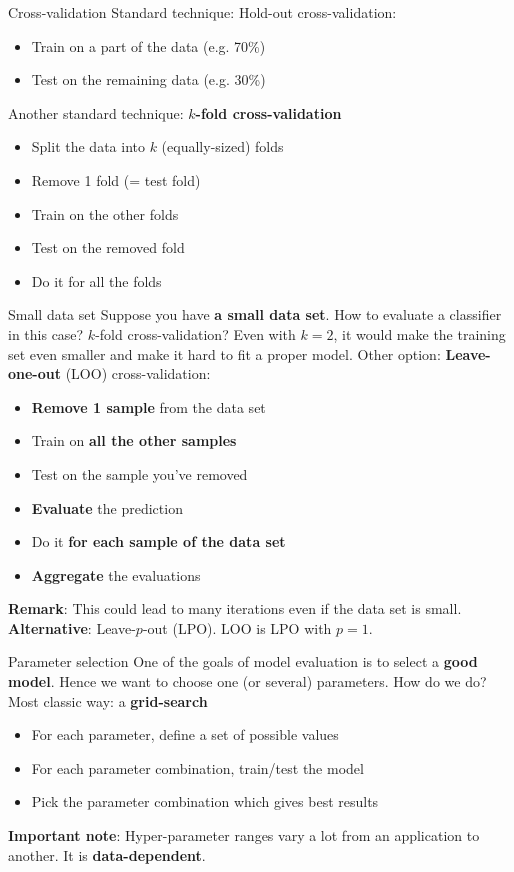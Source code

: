 \documentclass{beamer}
\newcommand{\1}[1]{\mathbbm{1}\left[#1\right]}
\begin{document}
\begin{frame}{Cross-validation}
Standard technique: Hold-out cross-validation:
\begin{itemize}
	\item Train on a part of the data (e.g. 70\%)
	\item Test on the remaining data (e.g. 30\%)
\end{itemize}
\pause
\vfill
Another standard technique: \textbf{$k$-fold cross-validation}
\begin{itemize}
	\item Split the data into $k$ (equally-sized) folds
	\item Remove 1 fold (= test fold)
	\item Train on the other folds
	\item Test on the removed fold
	\item Do it for all the folds
\end{itemize}
\end{frame}

\begin{frame}{Small data set}
Suppose you have \textbf{a small data set}. How to evaluate a classifier in this case?
\vfill
\pause
$k$-fold cross-validation? Even with $k = 2$, it would make the training set even smaller and make it hard to fit a proper model.
\vfill
\pause
Other option: \textbf{Leave-one-out} (LOO) cross-validation:
\pause
\begin{itemize}
	\item \textbf{Remove 1 sample} from the data set
	\item Train on \textbf{all the other samples}
	\item Test on the sample you've removed
	\item \textbf{Evaluate} the prediction
	\item Do it \textbf{for each sample of the data set}
	\item \textbf{Aggregate} the evaluations
\end{itemize}
\pause
\vfill
\textbf{Remark}: This could lead to many iterations even if the data set is small.
\pause
\vfill
\textbf{Alternative}: Leave-$p$-out (LPO). LOO is LPO with $p = 1$.
\end{frame}

\begin{frame}{Parameter selection}
One of the goals of model evaluation is to select a \textbf{good model}.
\vfill
\pause
Hence we want to choose one (or several) parameters. How do we do?
\vfill
\pause
Most classic way: a \textbf{grid-search}
\begin{itemize}
	\item For each parameter, define a set of possible values
	\item For each parameter combination, train/test the model
	\item Pick the parameter combination which gives best results
\end{itemize}
\vfill
\pause
\textbf{Important note}: Hyper-parameter ranges vary a lot from an application to another. It is \textbf{data-dependent}.
\end{frame}
\end{document}
